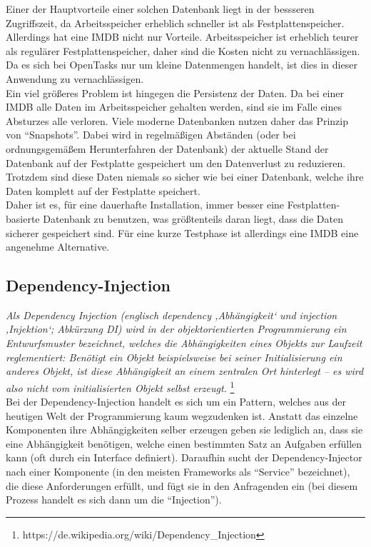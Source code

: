 Einer der Hauptvorteile einer solchen Datenbank liegt in der bessseren Zugriffszeit, da Arbeitsspeicher erheblich schneller ist als Festplattenspeicher. Allerdings hat eine IMDB nicht nur Vorteile. Arbeitsspeicher ist erheblich teurer als regulärer Festplattenspeicher, daher sind die Kosten nicht zu vernachlässigen. Da es sich bei OpenTasks nur um kleine Datenmengen handelt, ist dies in dieser Anwendung zu vernachlässigen. \\
Ein viel größeres Problem ist hingegen die Persistenz der Daten. Da bei einer IMDB alle Daten im Arbeitsspeicher gehalten werden, sind sie im Falle eines Absturzes alle verloren. Viele moderne Datenbanken nutzen daher das Prinzip von ``Snapshots''. Dabei wird in regelmäßigen Abständen (oder bei ordnungsgemäßem Herunterfahren der Datenbank) der aktuelle Stand der Datenbank auf der Festplatte gespeichert um den Datenverlust zu reduzieren. Trotzdem sind diese Daten niemals so sicher wie bei einer Datenbank, welche ihre Daten komplett auf der Festplatte speichert. \\

Daher ist es, für eine dauerhafte Installation, immer besser eine Festplatten-basierte Datenbank zu benutzen, was größtenteils daran liegt, dass die Daten sicherer gespeichert sind. Für eine kurze Testphase ist allerdings eine IMDB eine angenehme Alternative.

\subsection{Dependency-Injection}

\emph{\glqq   
Als Dependency Injection (englisch dependency ‚Abhängigkeit‘ und injection ‚Injektion‘; Abkürzung DI) wird in der objektorientierten Programmierung ein Entwurfsmuster bezeichnet, welches die Abhängigkeiten eines Objekts zur Laufzeit reglementiert: Benötigt ein Objekt beispielsweise bei seiner Initialisierung ein anderes Objekt, ist diese Abhängigkeit an einem zentralen Ort hinterlegt – es wird also nicht vom initialisierten Objekt selbst erzeugt. \grqq} \footnote{https://de.wikipedia.org/wiki/Dependency\_Injection} \\ 

Bei der Dependency-Injection handelt es sich um ein Pattern, welches aus der heutigen Welt der Programmierung kaum wegzudenken ist. Anstatt das einzelne Komponenten ihre Abhängigkeiten selber erzeugen geben sie lediglich an, dass sie eine Abhängigkeit benötigen, welche einen bestimmten Satz an Aufgaben erfüllen kann (oft durch ein Interface definiert). Daraufhin sucht der Dependency-Injector nach einer Komponente (in den meisten Frameworks als ``Service'' bezeichnet), die diese Anforderungen erfüllt, und fügt sie in den Anfragenden ein (bei diesem Prozess handelt es sich dann um die ``Injection''). \\

